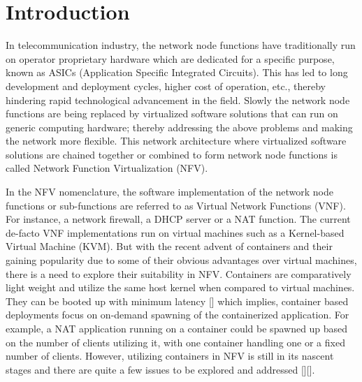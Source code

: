 \documentclass[english, 12pt, a4paper, elec, utf8, a-1b, online]{aaltothesis}
\begin{document}
\cleardoublepage

\section{Introduction}

\thispagestyle{empty}
In telecommunication industry, the network node functions have traditionally run on operator proprietary hardware which are dedicated for a specific purpose, known as ASICs (Application Specific Integrated Circuits). This has led to long development and deployment cycles, higher cost of operation, etc., thereby hindering rapid technological advancement in the field. Slowly the network node functions are being replaced by virtualized software solutions that can run on generic computing hardware; thereby addressing the above problems and making the network more flexible. This network architecture where virtualized software solutions are chained together or combined to form network node functions is called Network Function Virtualization (NFV).

In the NFV nomenclature, the software implementation of the network node functions or sub-functions are referred to as Virtual Network Functions (VNF). For instance, a network firewall, a DHCP server or a NAT function. The current de-facto VNF implementations run on virtual machines such as a Kernel-based Virtual Machine (KVM). But with the recent advent of containers and their gaining popularity due to some of their obvious advantages over virtual machines, there is a need to explore their suitability in NFV. Containers are comparatively light weight and utilize the same host kernel when compared to virtual machines. They can be booted up with minimum latency [] which implies, container based deployments focus on on-demand spawning of the containerized application. For example, a NAT application running on a container could be spawned up based on the number of clients utilizing it, with one container handling one or a fixed number of clients. However, utilizing containers in NFV is still in its nascent stages and there are quite a few issues to be explored and addressed [][].
\end{document}
